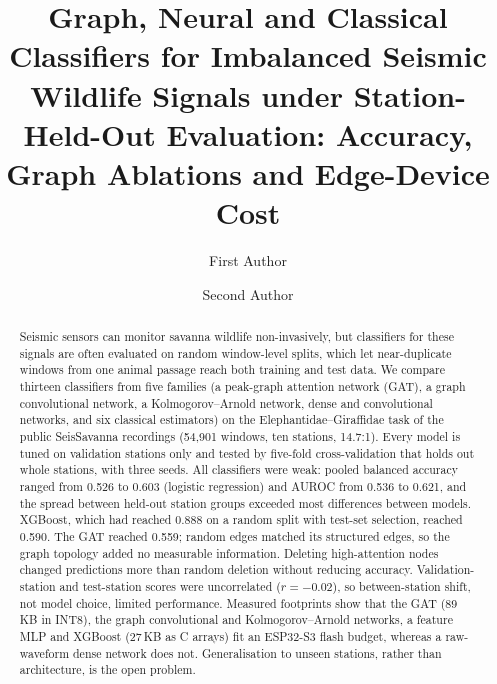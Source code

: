 \documentclass[a4paper,fleqn]{cas-dc}
\begin{document}
\let\WriteBookmarks\relax
\def\floatpagepagefraction{1}
\def\textpagefraction{.001}

\shortauthors{}  %

\title[mode=title]{Graph, Neural and Classical Classifiers for Imbalanced Seismic
Wildlife Signals under Station-Held-Out Evaluation: Accuracy, Graph Ablations and
Edge-Device Cost}

\author[1]{First Author}
\cormark[1]

\author[1]{Second Author}



\begin{abstract}
Seismic sensors can monitor savanna wildlife non-invasively, but classifiers for these
signals are often evaluated on random window-level splits, which let near-duplicate
windows from one animal passage reach both training and test data. We compare thirteen
classifiers from five families (a peak-graph attention network (GAT), a graph
convolutional network, a Kolmogorov--Arnold network, dense and convolutional networks,
and six classical estimators) on the Elephantidae--Giraffidae task of the public
SeisSavanna recordings (54,901 windows, ten stations, 14.7:1). Every model is tuned on
validation stations only and tested by five-fold cross-validation that holds out whole
stations, with three seeds. All classifiers were weak: pooled balanced accuracy ranged
from 0.526 to 0.603 (logistic regression) and AUROC from 0.536 to 0.621, and the spread
between held-out station groups exceeded most differences between models. XGBoost,
which had reached 0.888 on a random split with test-set selection, reached 0.590. The
GAT reached 0.559; random edges matched its structured edges, so the graph topology
added no measurable information. Deleting high-attention nodes changed predictions more
than random deletion without reducing accuracy. Validation-station and test-station
scores were uncorrelated ($r=-0.02$), so between-station shift, not model choice,
limited performance. Measured footprints show that the GAT (89\,KB in INT8), the
graph convolutional and Kolmogorov--Arnold networks, a feature MLP and XGBoost (27\,KB
as C arrays) fit an ESP32-S3 flash budget, whereas a raw-waveform dense network does
not. Generalisation to unseen stations, rather than architecture, is the open problem.
\end{abstract}
\end{document}

